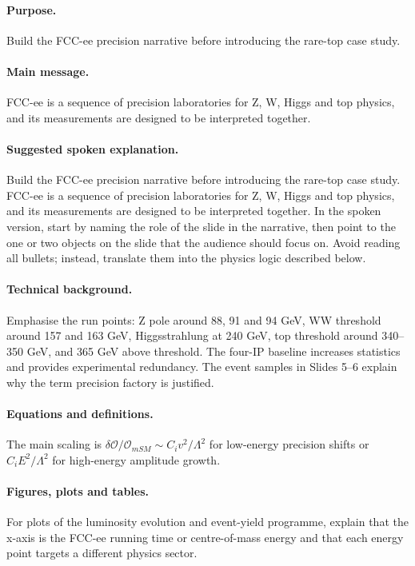 \documentclass[11pt,a4paper]{report}
\begin{document}
\paragraph{Purpose.}
Build the FCC-ee precision narrative before introducing the rare-top case study.

\paragraph{Main message.}
FCC-ee is a sequence of precision laboratories for Z, W, Higgs and top physics, and its measurements are designed to be interpreted together.

\paragraph{Suggested spoken explanation.}
Build the FCC-ee precision narrative before introducing the rare-top case study. FCC-ee is a sequence of precision laboratories for Z, W, Higgs and top physics, and its measurements are designed to be interpreted together. In the spoken version, start by naming the role of the slide in the narrative, then point to the one or two objects on the slide that the audience should focus on.  Avoid reading all bullets; instead, translate them into the physics logic described below.

\paragraph{Technical background.}
Emphasise the run points: Z pole around 88, 91 and 94 GeV, WW threshold around 157 and 163 GeV, Higgsstrahlung at 240 GeV, top threshold around 340--350 GeV, and 365 GeV above threshold.  The four-IP baseline increases statistics and provides experimental redundancy.  The event samples in Slides 5--6 explain why the term precision factory is justified.

\paragraph{Equations and definitions.}
The main scaling is $\delta\mathcal O/\mathcal O_{
m SM}\sim C_i v^2/\Lambda^2$ for low-energy precision shifts or $C_iE^2/\Lambda^2$ for high-energy amplitude growth.

\paragraph{Figures, plots and tables.}
For plots of the luminosity evolution and event-yield programme, explain that the x-axis is the FCC-ee running time or centre-of-mass energy and that each energy point targets a different physics sector.
\end{document}
